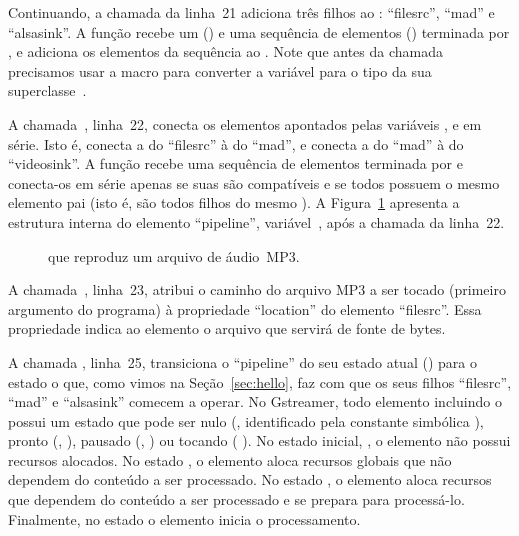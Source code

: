 \documentclass{SBCbookchapter}
\begin{document}
Continuando, a chamada da linha~21 adiciona três filhos ao :
``filesrc'', ``mad'' e ``alsasink''.  A função  recebe
um  () e uma sequência de elementos ()
terminada por , e adiciona os elementos da sequência ao .
Note que antes da chamada precisamos usar a macro  para converter
a variável  para o tipo da sua superclasse~.

A chamada~, linha~22, conecta os elementos
apontados pelas variáveis ,  e  em série.  Isto é,
conecta a  do ``filesrc'' à  do ``mad'', e
conecta a  do ``mad'' à  do ``videosink''.
A função  recebe uma sequência de elementos
terminada por  e conecta-os em série apenas se suas  são
compatíveis e se todos possuem o mesmo elemento pai (isto é, são todos
filhos do mesmo ).  A Figura~\ref{fig:pipe-mp3} apresenta a
estrutura interna do elemento ``pipeline'', variável~, após a
chamada da linha~22.

\begin{figure}[t]
  \centering
  \caption{ que reproduz um arquivo de áudio~MP3.}
  \label{fig:pipe-mp3}
\end{figure}

A chamada~, linha~23, atribui o caminho do arquivo MP3 a ser
tocado (primeiro argumento do programa) à propriedade ``location'' do
elemento ``filesrc''.  Essa propriedade indica ao elemento o arquivo que
servirá de fonte de bytes.

A chamada , linha~25, transiciona o ``pipeline'' do
seu estado atual () para o estado  o que, como vimos na
Seção~\ref{sec:hello}, faz com que os seus filhos ``filesrc'', ``mad'' e
``alsasink'' comecem a operar.  No Gstreamer, todo elemento incluindo o
 possui um estado que pode ser nulo (, identificado
pela constante simbólica ), pronto (,
), pausado (, ) ou tocando
( ).  No estado inicial, , o
elemento não possui recursos alocados.  No estado , o elemento
aloca recursos globais que não dependem do conteúdo a ser processado.  No
estado , o elemento aloca recursos que dependem do conteúdo a ser
processado e se prepara para processá-lo.  Finalmente, no estado
 o elemento inicia o processamento.
\end{document}
